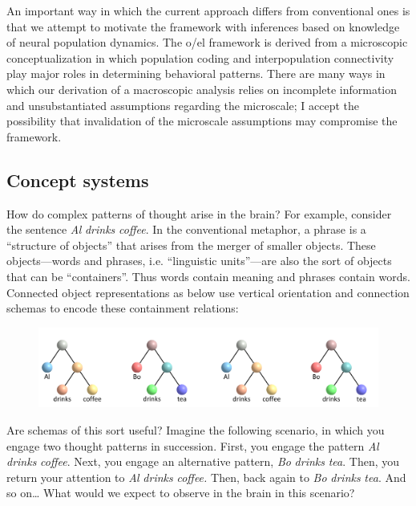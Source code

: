   An important way in which the current approach differs from conventional ones is that we attempt to motivate the framework with inferences based on knowledge of neural population dynamics. The o/el framework is derived from a microscopic conceptualization in which population coding and interpopulation connectivity play major roles in determining behavioral patterns. There are many ways in which our derivation of a macroscopic analysis relies on incomplete information and unsubstantiated assumptions regarding the microscale; I accept the possibility that invalidation of the microscale assumptions may compromise the framework.

\subsection{Concept systems}

How do complex patterns of thought arise in the brain? For example, consider the sentence \textit{Al} \textit{drinks} \textit{coffee}. In the conventional metaphor, a phrase is a “structure of objects” that arises from the merger of smaller objects. These objects—words and phrases, i.e. “linguistic units”—are also the sort of objects that can be “containers”. Thus words contain meaning and phrases contain words. Connected object representations as below use vertical orientation and connection schemas to encode these containment relations:

  
\begin{figure}
\includegraphics[width=\textwidth]{figures/Tilsen-img8.png}
\caption{\missingcaption}
\label{fig:}
\end{figure}
 

  Are schemas of this sort useful? Imagine the following scenario, in which you engage two thought patterns in succession. First, you engage the pattern \textit{Al} \textit{drinks} \textit{coffee}. Next, you engage an alternative pattern, \textit{Bo} \textit{drinks} \textit{tea}. Then, you return your attention to \textit{Al} \textit{drinks} \textit{coffee.} Then, back again to \textit{Bo} \textit{drinks} \textit{tea}. And so on… What would we expect to observe in the brain in this scenario? 

